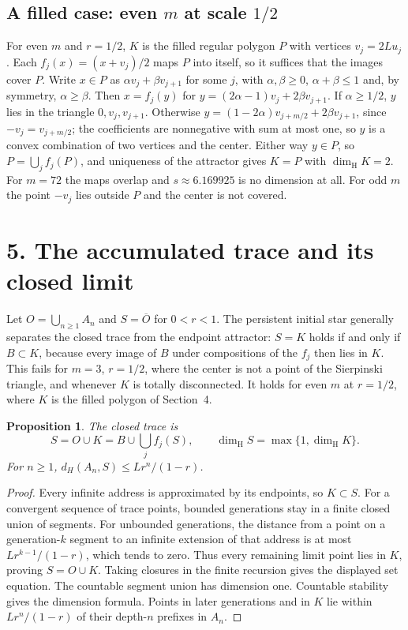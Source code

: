 \documentclass[11pt,a4paper]{article}
\newtheorem{proposition}{Proposition}
\newcommand{\dimH}{\dim_{\mathrm H}}
\newcommand{\sectiontitle}[1]{\section*{\sffamily\color{ink}#1}}
\begin{document}
\subsection*{A filled case: even $m$ at scale $1/2$}
For even $m$ and $r=1/2$, $K$ is the filled regular polygon $P$ with
vertices $v_j=2Lu_j$. Each \mbox{$f_j(x)=(x+v_j)/2$} maps $P$ into itself,
so it suffices that the images cover $P$. Write $x\in P$ as
$\alpha v_j+\beta v_{j+1}$ for some $j$, with $\alpha,\beta\ge0$,
$\alpha+\beta\le1$ and, by symmetry, $\alpha\ge\beta$. Then $x=f_j(y)$ for
$y=(2\alpha-1)v_j+2\beta v_{j+1}$. If $\alpha\ge1/2$, $y$ lies in the
triangle $0,v_j,v_{j+1}$. Otherwise $y=(1-2\alpha)v_{j+m/2}+2\beta v_{j+1}$,
since $-v_j=v_{j+m/2}$; the coefficients are nonnegative with sum at most
one, so $y$ is a convex combination of two vertices and the center. Either
way $y\in P$, so $P=\bigcup_jf_j(P)$, and uniqueness of the attractor gives
$K=P$ with $\dimH K=2$. For $m=72$ the maps overlap and $s\approx6.169925$
is no dimension at all. For odd $m$ the point $-v_j$ lies outside $P$ and
the center is not covered.

\newpage
\sectiontitle{5. The accumulated trace and its closed limit}
Let $O=\bigcup_{n\ge1}A_n$ and $S=\overline O$ for $0<r<1$. The persistent
initial star generally separates the closed trace from the endpoint
attractor: $S=K$ holds if and only if $B\subset K$, because every image of
$B$ under compositions of the $f_j$ then lies in $K$. This fails for $m=3$,
$r=1/2$, where the center is not a point of the Sierpinski triangle, and
whenever $K$ is totally disconnected. It holds for even $m$ at $r=1/2$,
where $K$ is the filled polygon of Section~4.

\begin{proposition}
The closed trace is
\[
S=O\cup K=B\cup\bigcup_j f_j(S),\qquad
\dimH S=\max\{1,\dimH K\}.
\]
For $n\ge1$, $d_H(A_n,S)\le Lr^n/(1-r)$.
\end{proposition}
\begin{proof}
Every infinite address is approximated by its endpoints, so $K\subset S$.
For a convergent sequence of trace points, bounded generations stay in
a finite closed union of segments. For unbounded generations, the
distance from a point on a generation-$k$ segment to an infinite
extension of that address is at most $Lr^{k-1}/(1-r)$, which tends to
zero. Thus every remaining limit point lies in $K$, proving $S=O\cup K$.
Taking closures in the finite recursion gives the displayed set equation.
The countable segment union has dimension one. Countable stability gives
the dimension formula. Points in later generations and in $K$ lie
within $Lr^n/(1-r)$ of their depth-$n$ prefixes in $A_n$.
\end{proof}
\end{document}
